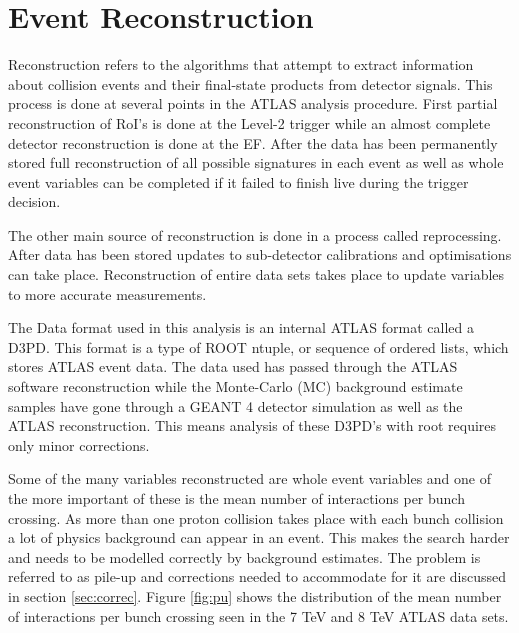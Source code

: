 \chapter{Event Reconstruction}

Reconstruction refers to the algorithms that attempt to extract information about collision events and their final-state products from detector signals. This process is done at several points in the ATLAS analysis procedure. First partial reconstruction of RoI's is done at the Level-2 trigger while an almost complete detector reconstruction is done at the EF. After the data has been permanently stored full reconstruction of all possible signatures in each event as well as whole event variables can be completed if it failed to finish live during the trigger decision.

The other main source of reconstruction is done in a process called reprocessing. After data has been stored updates to sub-detector calibrations and optimisations can take place. Reconstruction of entire data sets takes place to update variables to more accurate measurements. 

The Data format used in this analysis is an internal ATLAS format called a D3PD. This format is a type of ROOT \cite{Antcheva20092499} ntuple, or sequence of ordered lists, which stores ATLAS event data. The data used has passed through the ATLAS software reconstruction while the Monte-Carlo (MC) background estimate samples have gone through a GEANT 4 \cite{Agostinelli2003250} detector simulation as well as the ATLAS reconstruction. This means analysis of these D3PD's with root requires only minor corrections.


Some of the many variables reconstructed are whole event variables and one of the more important of these is the mean number of interactions per bunch crossing. As more than one proton collision takes place with each bunch collision a lot of physics background can appear in an event. This makes the search harder and needs to be modelled correctly by background estimates. The problem is referred to as pile-up and corrections needed to accommodate for it are discussed in section \ref{sec:correc}. Figure \ref{fig:pu} shows the distribution of the mean number of interactions per bunch crossing seen in the 7 TeV and 8 TeV ATLAS data sets.

